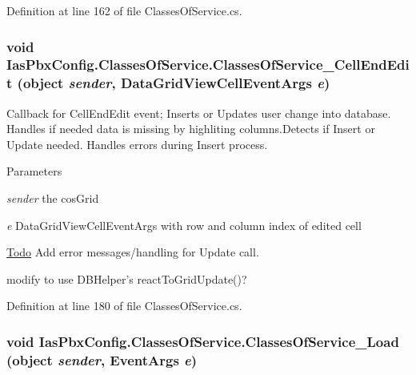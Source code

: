 Definition at line 162 of file ClassesOfService.cs.\hypertarget{class_ias_pbx_config_1_1_classes_of_service_a8353a8ba4d45caf1c2feebb4ca79b07e}{
\subsubsection[{ClassesOfService\_\-CellEndEdit}]{\setlength{\rightskip}{0pt plus 5cm}void IasPbxConfig.ClassesOfService.ClassesOfService\_\-CellEndEdit (object {\em sender}, \/  DataGridViewCellEventArgs {\em e})}}
\label{class_ias_pbx_config_1_1_classes_of_service_a8353a8ba4d45caf1c2feebb4ca79b07e}


Callback for CellEndEdit event; Inserts or Updates user change into database. Handles if needed data is missing by highliting columns.Detects if Insert or Update needed. Handles errors during Insert process.


\begin{DoxyParams}{Parameters}
\item[{\em sender}]the cosGrid \item[{\em e}]DataGridViewCellEventArgs with row and column index of edited cell \end{DoxyParams}
\begin{Desc}
\item[\hyperlink{todo__todo000005}{Todo}]Add error messages/handling for Update call. 

modify to use DBHelper's reactToGridUpdate()? \end{Desc}


Definition at line 180 of file ClassesOfService.cs.\hypertarget{class_ias_pbx_config_1_1_classes_of_service_a289f97c10a4bc8cf69521227e97ed4c5}{
\subsubsection[{ClassesOfService\_\-Load}]{\setlength{\rightskip}{0pt plus 5cm}void IasPbxConfig.ClassesOfService.ClassesOfService\_\-Load (object {\em sender}, \/  EventArgs {\em e})}}
\label{class_ias_pbx_config_1_1_classes_of_service_a289f97c10a4bc8cf69521227e97ed4c5}


